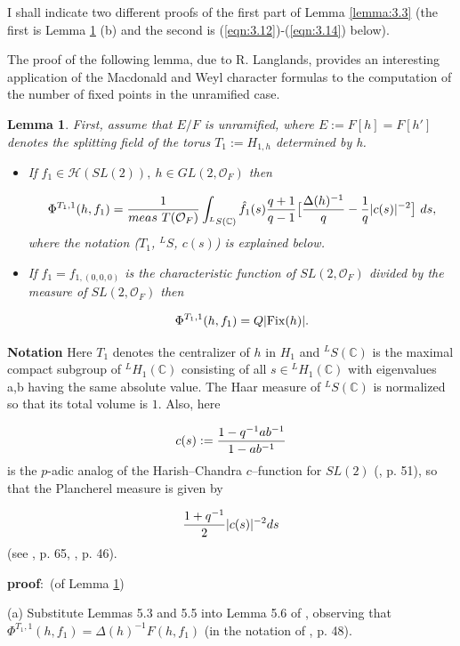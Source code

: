 \documentclass[12pt,letterpaper]{amsart}
\numberwithin{equation}{section}
\newtheorem{lemma}[theorem]{Lemma}
\theoremstyle{definition}
\theoremstyle{plain}
\providecommand{\cal}{\mathcal}
\def\hhh{{\cal H}}
\def\ccc{\mathbb{C}}
\def\pf{{\bf proof}:\ }
\def\off{{\cal O}_F}
\begin{document}
I shall indicate two different proofs of the first part of 
Lemma \ref{lemma:3.3}
(the first is Lemma \ref{lemma:3.4} (b) and the second is 
(\ref{eqn:3.12})-(\ref{eqn:3.14}) below).
 
The proof
of the following lemma, due to R. Langlands, provides an interesting
application of the Macdonald and Weyl character formulas to the computation of
the number of fixed points in the unramified case.

\begin{lemma}
\label{lemma:3.4} 
First, assume that $E/F$ is unramified, 
where $E:=F[h]=F[h']$ denotes the splitting
field of the torus $T_1:=H_{1,h}$ determined by h. 

\begin{itemize}

\item[(a)] 
If $f_1\in \hhh (SL(2)),\ h\in GL(2,\off )$ then

\[
\Phi^{T_1,1}(h,f_1) = {1\over{meas\ T(\off )}}\int_{^{L}S(\ccc )}
\hat{f_1}(s){q+1\over{q-1}}\big[ {\Delta (h)^{-1}\over{q}}
-{1\over{q}}|c(s)|^{-2}\big]\ ds,
\]
where the notation ($T_1$, $^LS$, $c(s)$) is explained below.

\item[(b)] 
If $f_1 =f_{1,(0,0,0)}$ is the characteristic function of $SL(2,\off )$
divided by the measure of $SL(2,\off )$ then

\[
\Phi^{T_1,1}(h,f_1)=Q|{\rm Fix} (h)|.
\]
\end{itemize}
\end{lemma}

{\bf Notation}
Here $T_1$ denotes the centralizer of $h$ in $H_1$ and
$^{L}S(\ccc )$ is the maximal compact subgroup of $^{L}H_1(\ccc )$
consisting of all $s\in {^{L}H_1}(\ccc )$ with eigenvalues a,b having the
same absolute value. The Haar measure of $^{L}S(\ccc )$ is normalized so 
that its total volume is $1$. Also, here

\[
c(s) := {1-q^{-1}ab^{-1}\over{1-ab^{-1}}}
\]
is the $p$-adic analog of the Harish--Chandra $c$--function for $SL(2)$
(\cite{Ma71}, p. 51), so that the Plancherel measure is given by

\[
{1+q^{-1}\over{2}}|c(s)|^{-2}ds
\]
(see \cite{Ma71}, p. 65, \cite{La80b}, p. 46).

\pf (of Lemma \ref{lemma:3.4})

(a) Substitute Lemmas 5.3 and 5.5 into Lemma 5.6 of \cite{La80b},
observing that $\Phi^{T_1,1}(h,f_1)=\Delta (h)^{-1}F(h,f_1)$
(in the notation of \cite{La80b}, p. 48).
\end{document}
